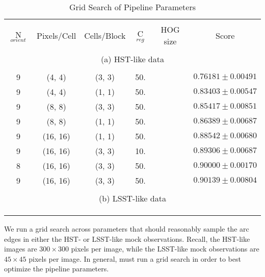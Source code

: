 \documentclass{emulateapj}
\begin{document}
\begin{table}
\caption{Grid Search of Pipeline Parameters}
\begin{center}
\begin{tabular}{cccccc}
\hline \\ [-0.2cm]
N$_{orient}$ & Pixels/Cell & Cells/Block & C$_{reg}$ & HOG size & Score \\ [0.2cm]
\hline \\ [-0.2cm]
\multicolumn{6}{c}{(a) HST-like data} \\ [0.2cm]
\hline \\ [-0.2cm]
9 & (4, 4) & (3, 3) & 50. & &$0.76181\pm0.00491$\\ [0.2cm]
9 & (4, 4) & (1, 1) & 50. & &$0.83403\pm0.00547$\\ [0.2cm]
9 & (8, 8) & (3, 3) & 50. & &$0.85417\pm0.00851$\\ [0.2cm] 
9 & (8, 8) & (1, 1) & 50. & &$0.86389\pm0.00687$\\ [0.2cm] 
9 & (16, 16) & (1, 1) & 50. & & $0.88542\pm0.00680$ \\ [0.2cm]
9 & (16, 16) & (3, 3) & 10. & &$0.89306\pm0.00687$ \\ [0.2cm]
8 & (16, 16) & (3, 3) & 50. & &$0.90000\pm0.00170$ \\ [0.2cm]
9 & (16, 16) & (3, 3) & 50. & &$0.90139\pm0.00804$ \\ [0.2cm]
\hline \\ [-0.2cm]
\multicolumn{6}{c}{(b) LSST-like data} \\ [0.2cm]
\hline \\ [-0.2cm]
& & & & &\\
& & & & &\\ [0.2cm]
\hline
\end{tabular}
\end{center}
\label{tab:gridsearch}
\end{table}

We run a grid search across parameters that should reasonably sample
the arc edges in either the HST- or LSST-like mock observations.
Recall, the HST-like images are $300\times300$ pixels per image, while
the LSST-like mock observations are $45\times45$ pixels per image.  In
general, must run a grid search in order to best optimize the pipeline
parameters.
\end{document}
